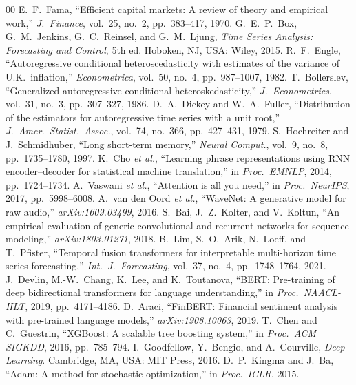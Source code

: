 \documentclass[conference]{IEEEtran}
\begin{document}
\begin{thebibliography}{00}
 E.~F.~Fama, ``Efficient capital markets: A review of theory and empirical
work,'' \emph{J.\ Finance}, vol.~25, no.~2, pp.~383--417, 1970.
 G.~E.~P.~Box, G.~M.~Jenkins, G.~C.~Reinsel, and G.~M.~Ljung, \emph{Time Series
Analysis: Forecasting and Control}, 5th ed. Hoboken, NJ, USA: Wiley, 2015.
 R.~F.~Engle, ``Autoregressive conditional heteroscedasticity with estimates
of the variance of U.K.\ inflation,'' \emph{Econometrica}, vol.~50, no.~4, pp.~987--1007, 1982.
 T.~Bollerslev, ``Generalized autoregressive conditional heteroskedasticity,''
\emph{J.\ Econometrics}, vol.~31, no.~3, pp.~307--327, 1986.
 D.~A.~Dickey and W.~A.~Fuller, ``Distribution of the estimators for
autoregressive time series with a unit root,'' \emph{J.\ Amer.\ Statist.\ Assoc.}, vol.~74,
no.~366, pp.~427--431, 1979.
 S.~Hochreiter and J.~Schmidhuber, ``Long short-term memory,''
\emph{Neural Comput.}, vol.~9, no.~8, pp.~1735--1780, 1997.
 K.~Cho \emph{et al.}, ``Learning phrase representations using RNN
encoder--decoder for statistical machine translation,'' in \emph{Proc.\ EMNLP}, 2014,
pp.~1724--1734.
 A.~Vaswani \emph{et al.}, ``Attention is all you need,'' in
\emph{Proc.\ NeurIPS}, 2017, pp.~5998--6008.
 A.~van den Oord \emph{et al.}, ``WaveNet: A generative model for raw
audio,'' \emph{arXiv:1609.03499}, 2016.
 S.~Bai, J.~Z.~Kolter, and V.~Koltun, ``An empirical evaluation of generic
convolutional and recurrent networks for sequence modeling,'' \emph{arXiv:1803.01271}, 2018.
 B.~Lim, S.~O.~Arik, N.~Loeff, and T.~Pfister, ``Temporal fusion transformers
for interpretable multi-horizon time series forecasting,'' \emph{Int.\ J.\ Forecasting},
vol.~37, no.~4, pp.~1748--1764, 2021.
 J.~Devlin, M.-W.~Chang, K.~Lee, and K.~Toutanova, ``BERT: Pre-training of deep
bidirectional transformers for language understanding,'' in \emph{Proc.\ NAACL-HLT}, 2019,
pp.~4171--4186.
 D.~Araci, ``FinBERT: Financial sentiment analysis with pre-trained
language models,'' \emph{arXiv:1908.10063}, 2019.
 T.~Chen and C.~Guestrin, ``XGBoost: A scalable tree boosting system,'' in
\emph{Proc.\ ACM SIGKDD}, 2016, pp.~785--794.
 I.~Goodfellow, Y.~Bengio, and A.~Courville, \emph{Deep Learning}.
Cambridge, MA, USA: MIT Press, 2016.
 D.~P.~Kingma and J.~Ba, ``Adam: A method for stochastic optimization,'' in
\emph{Proc.\ ICLR}, 2015.

\end{thebibliography}
\end{document}
